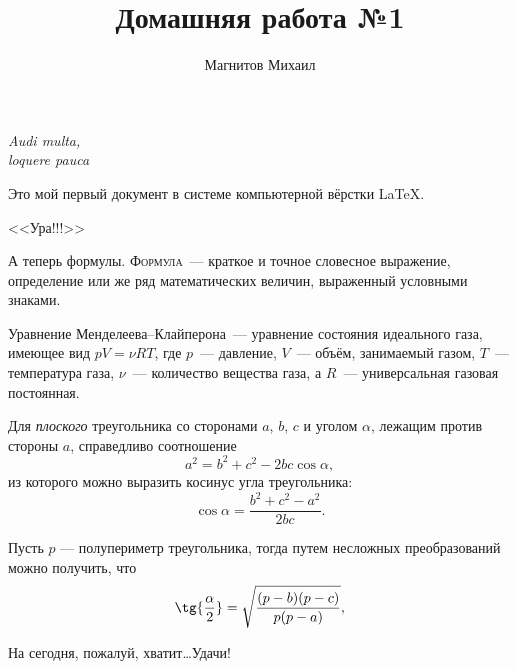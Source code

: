 \documentclass[12pt]{article}
\begin{document}
    \title{Домашняя работа №1}
    \author{Магнитов Михаил}
    \date{}
    \maketitle
    
    \begin{flushright}
        \textit{Audi multa,\\loquere pauca}
    \end{flushright}\par
    \vspace{20pt}
    Это мой первый документ в системе компьютерной вёрстки \LaTeX.
    \begin{center}
        \textsf{\Huge{<<Ура!!!>>}}
    \end{center}\par
    А теперь формулы. \textsc{Формула}~--- краткое и точное словесное выражение, определение или же ряд математических величин, выраженный условными знаками.\par
    \vspace*{15pt}
    \par
    Уравнение Менделеева--Клайперона~--- уравнение состояния идеального газа, имеющее вид $pV = \nu RT$, где $p$~--- давление, $V$~--- объём, занимаемый газом, $T$~--- температура газа, $\nu$~--- количество вещества газа, а $R$~--- универсальная газовая постоянная.\par
    \vspace*{15pt}
    \par
    Для \textsl{плоского} треугольника со сторонами $a$, $b$, $c$ и уголом $\alpha$, лежащим против стороны $a$, справедливо соотношение
    $$
    a^2 = b^2 + c^2 - 2bc\cos{\alpha},
    $$
    из которого можно выразить косинус угла треугольника:
    $$
    \cos{\alpha} = \frac{b^2 + c^2 - a^2}{2bc}.
    $$\par
    Пусть $p$ --- полупериметр треугольника, тогда путем несложных преобразований можно получить, что
    $$
    \tg{\frac{\alpha}{2}} = \sqrt{\frac{(p - b)(p - c)}{p(p - a)}},
    $$\par
    \vspace*{1cm}
    \begin{flushleft}
        На сегодня, пожалуй, хватит\dots Удачи!
    \end{flushleft}
\end{document}
